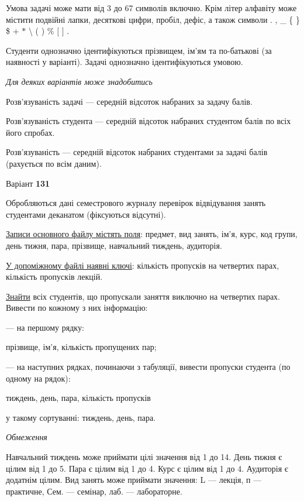 \documentclass[11pt, ukrainian]{article}
\begin{document}
Умова задачі може мати від 3 до 67 символів включно.
Крім літер алфавіту може містити подвійні лапки, десяткові цифри, пробіл, дефіс,
а також символи . , \_ \{ \} \$ $+$ $*$ {\textbackslash} ( ) \% $[$ $]$ .

Студенти однозначно ідентифікуються прізвищем, ім’ям та по-батькові (за наявності у варіанті).
Задачі однозначно ідентифікуються умовою.

\bigskip\textit{Для деяких варіантів може знадобитись}

Розв'язуваність задачі --- середній відсоток набраних за задачу балів.

Розв'язуваність студента --- середній відсоток набраних студентом балів по всіх його спробах.

Розв'язуваність --- середній відсоток набраних студентами за задачі балів (рахується по всім даним).




\par
\newpage
{\center Варіант  \No \textbf { 131 }\par}
\bigskip
Обробляються дані семестрового журналу перевірок відвідування занять студентами деканатом (фіксуються відсутні). 

\underline{Записи основного файлу містять поля}: предмет, вид занять, ім’я, курс, код групи, день тижня, пара, прізвище, навчальний тиждень, аудиторія.

\underline{У допоміжному файлі наявні ключі}: кількість пропусків на четвертих парах, кількість пропусків лекцій.

\underline{Знайти} всіх студентів, що пропускали заняття виключно на четвертих парах. Вивести по кожному з них інформацію:\par
{\noindent}--- на першому рядку:\par
прізвище, ім’я, кількість пропущених пар;

{\noindent}--- на наступних рядках, починаючи з табуляції, вивести пропуски студента (по одному на рядок):\par
тиждень, день, пара, кількість пропусків

{\noindent}у такому сортуванні: тиждень, день, пара.


\bigskip\textit{Обмеження}

Навчальний тиждень може приймати цілі значення від 1 до 14.
День тижня є цілим від 1 до 5. Пара є цілим від 1 до 4.
Курс є цілим від 1 до 4. Аудиторія є додатнім цілим.
Вид занять може приймати значення:
L --- лекція, п --- практичне, Сем. --- семінар, лаб. --- лабораторне.
\end{document}
